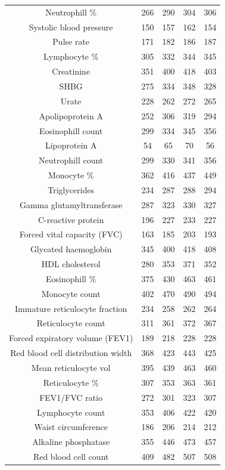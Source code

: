 \begin{footnotesize}
\begin{longtable}[h!]{|c|c|c|c|c|}
Neutrophill \% & 266 & 290 & 304 & 306 \\
Systolic blood pressure & 150 & 157 & 162 & 154 \\
Pulse rate & 171 & 182 & 186 & 187 \\
Lymphocyte \% & 305 & 332 & 344 & 345 \\
Creatinine & 351 & 400 & 418 & 403 \\
SHBG & 275 & 334 & 348 & 328 \\
Urate & 228 & 262 & 272 & 265 \\
Apolipoprotein A & 252 & 306 & 319 & 294 \\
Eosinophill count & 299 & 334 & 345 & 356 \\
Lipoprotein A & 54 & 65 & 70 & 56 \\
Neutrophill count & 299 & 330 & 341 & 356 \\
Monocyte \% & 362 & 416 & 437 & 449 \\
Triglycerides & 234 & 287 & 288 & 294 \\
Gamma glutamyltransferase & 287 & 323 & 330 & 327 \\
C-reactive protein & 196 & 227 & 233 & 227 \\
Forced vital capacity (FVC) & 163 & 185 & 203 & 193 \\
Glycated haemoglobin & 345 & 400 & 418 & 408 \\
HDL cholesterol & 280 & 353 & 371 & 352 \\
Eosinophill \% & 375 & 430 & 463 & 461 \\
Monocyte count & 402 & 470 & 490 & 494 \\
Immature reticulocyte fraction & 234 & 258 & 262 & 264 \\
Reticulocyte count & 311 & 361 & 372 & 367 \\
Forced expiratory volume (FEV1) & 189 & 218 & 228 & 228 \\
Red blood cell distribution width & 368 & 423 & 443 & 425 \\
Mean reticulocyte vol & 395 & 439 & 463 & 460 \\
Reticulocyte \% & 307 & 353 & 363 & 361 \\
FEV1/FVC ratio & 272 & 301 & 323 & 307 \\
Lymphocyte count & 353 & 406 & 422 & 420 \\
Waist circumference & 186 & 206 & 214 & 212 \\
Alkaline phosphatase & 355 & 446 & 473 & 457 \\
Red blood cell count & 409 & 482 & 507 & 508 \\

\end{longtable}
\end{footnotesize}
